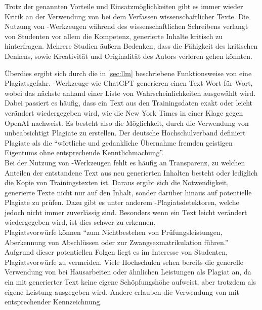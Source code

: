 \documentclass[../main.tex]{subfiles}
\begin{document}
Trotz der genannten Vorteile und Einsatzmöglichkeiten gibt es immer wieder Kritik an der Verwendung von  bei dem Verfassen wissenschaftlicher Texte. 
Die Nutzung von -Werkzeugen während des wissenschaftlichen Schreibens verlangt von Studenten vor allem die Kompetenz, generierte Inhalte kritisch zu 
hinterfragen. Mehrere Studien äußern Bedenken, dass die Fähigkeit des kritischen Denkens, sowie Kreativität und Originalität des Autors verloren gehen könnten.\cite{ZukunftWissenschaftlichesPublizieren,teachers,BucherSchwarzerHolzwweißig}

Überdies ergibt sich durch die in \autoref{sec:llm} beschriebene Funktionsweise von  eine Plagiatsgefahr. -Werkzeuge wie ChatGPT generieren einen Text Wort für Wort, wobei das nächste anhand 
einer Liste von Wahrscheinlichkeiten ausgewählt wird. Dabei passiert es häufig, dass ein Text aus den Trainingsdaten exakt oder leicht verändert wiedergegeben wird, wie die New York Times in 
einer Klage gegen OpenAI nachweist\cite{NYTimes}. Es besteht also die Möglichkeit, durch die Verwendung von  unbeabsichtigt Plagiate zu erstellen. Der deutsche Hochschulverband definiert Plagiate als 
die "`wörtliche und gedankliche Übernahme fremden geistigen Eigentums ohne entsprechende Kenntlichmachung"'.\cite{Hochschulverband} \\ Bei der Nutzung von -Werkzeugen fehlt es häufig an Transparenz, 
zu welchen Anteilen der entstandene Text aus neu generierten Inhalten besteht oder lediglich die Kopie von Trainingstexten ist. Daraus ergibt sich die Notwendigkeit,  generierte Texte nicht nur 
auf den Inhalt, sonder darüber hinaus auf potentielle Plagiate zu prüfen. Dazu gibt es unter anderem -Plagiatsdetektoren, welche jedoch nicht immer zuverlässig sind. Besonders wenn ein Text 
leicht verändert wiedergegeben wird, ist dies schwer zu erkennen.\\ Plagiatsvorwürfe können "`zum Nichtbestehen von Prüfungsleistungen, Aberkennung von Abschlüssen  oder  zur  Zwangsexmatrikulation  
führen."'\cite{Plagiate} Aufgrund dieser potentiellen Folgen liegt es im Interesse von Studenten, Plagiatsvorwürfe zu vermeiden. Viele Hochschulen sehen bereits die generelle Verwendung von  bei Hausarbeiten 
oder ähnlichen Leistungen als Plagiat an, da ein mit  generierter Text keine eigene Schöpfungshöhe aufweist, aber trotzdem als eigene Leistung ausgegeben wird. Andere erlauben die Verwendung von 
 mit entsprechender Kennzeichnung.\cite{Plagiate}
\end{document}
